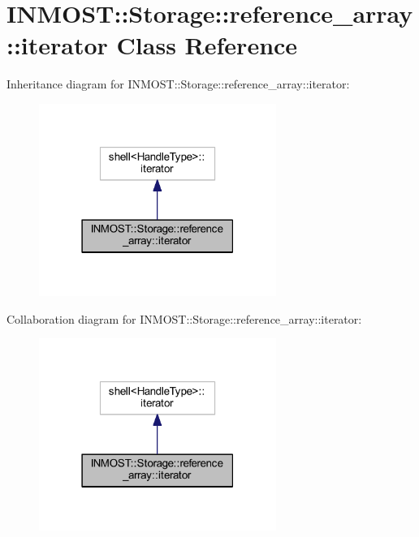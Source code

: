 \hypertarget{classINMOST_1_1Storage_1_1reference__array_1_1iterator}{\section{I\-N\-M\-O\-S\-T\-:\-:Storage\-:\-:reference\-\_\-array\-:\-:iterator Class Reference}
\label{classINMOST_1_1Storage_1_1reference__array_1_1iterator}
}


Inheritance diagram for I\-N\-M\-O\-S\-T\-:\-:Storage\-:\-:reference\-\_\-array\-:\-:iterator\-:
\nopagebreak
\begin{figure}[H]
\begin{center}
\leavevmode
\includegraphics[width=219pt]{classINMOST_1_1Storage_1_1reference__array_1_1iterator__inherit__graph}
\end{center}
\end{figure}


Collaboration diagram for I\-N\-M\-O\-S\-T\-:\-:Storage\-:\-:reference\-\_\-array\-:\-:iterator\-:
\nopagebreak
\begin{figure}[H]
\begin{center}
\leavevmode
\includegraphics[width=219pt]{classINMOST_1_1Storage_1_1reference__array_1_1iterator__coll__graph}
\end{center}
\end{figure}
